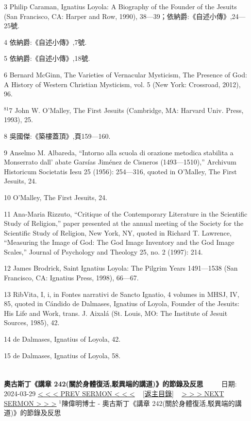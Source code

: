 \documentclass{book}
\begin{document}
3 Philip Caraman, Ignatius Loyola: A Biography of the Founder of the Jesuits (San Francisco, CA: Harper  and  Row, 1990), 38—39；依納爵:《自述小傳》,24—25號.

4 依納爵:《自述小傳》,7號.

5 依納爵:《自述小傳》,18號.

6 Bernard McGinn, The Varieties of Vernacular Mysticism, The Presence of God: A History of Western Christian Mysticism, vol. 5 (New York: Crossroad, 2012), 96.


$^{81}$7 John W. O’Malley, The First Jesuits (Cambridge, MA: Harvard Univ. Press, 1993), 25.

8 吳國傑:《築樓蓋頂》,頁159—160.

9 Anselmo M. Albareda, “Intorno alla scuola di orazione metodica stabilita a Monserrato dall’ abate Garsías Jiménez de Cisneros (1493—1510),” Archivum Historicum Societatis Iesu 25 (1956): 254—316, quoted in O’Malley, The First Jesuits, 24.

10 O’Malley, The First Jesuits, 24.

11 Ana-Maria Rizzuto, “Critique of the Contemporary Literature in the Scientific Study of Religion,” paper presented at the annual meeting of the Society for the Scientific Study of Religion, New York, NY, quoted in Richard T. Lawrence, “Measuring the Image of God: The God Image Inventory and the God Image Scales,” Journal of Psychology and Theology 25, no. 2 (1997): 214.

12 James Brodrick, Saint Ignatius Loyola: The Pilgrim Years 1491—1538 (San Francisco, CA: Ignatius Press, 1998), 66—67.

13 RibVita, I, i, in Fontes narrativi de Sancto Ignatio, 4 volumes in MHSJ, IV, 85, quoted in Cándido de Dalmases, Ignatius of Loyola, Founder of the Jesuits: His Life and Work, trans. J. Aixalá (St. Louis, MO: The Institute of Jesuit Sources, 1985), 42.

14 de Dalmases, Ignatius of Loyola, 42.

15 de Dalmases, Ignatius of Loyola, 58.
\newpage



\section{}
\label{sec:10}
\textbf{奧古斯丁《講章 242(關於身體復活,駁異端的講道)》的節錄及反思}
\newline
\newline
~~~~ 日期: 2024-03-29
\newline
\newline
\hyperref[sec:9]{\small{< < < PREV SERMON < < <}}
~
\hyperref[sec:index]{\small{[返主目錄]}}
~
\hyperref[sec:11]{\small{> > > NEXT SERMON > > >}}
\newline
\newline
$^{1}$陳偉明博士 - 奧古斯丁《講章 242(關於身體復活,駁異端的講道)》的節錄及反思
\end{document}
